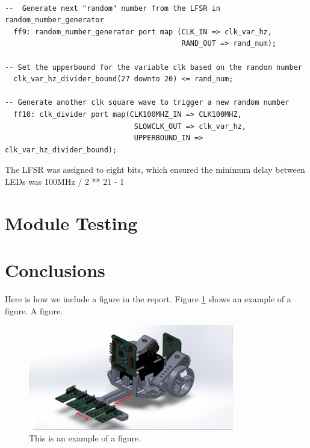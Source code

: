 \documentclass[12pt]{article}
\newenvironment{code}{\captionsetup{type=listing}}{}
\begin{document}
\begin{code}
\begin{verbatim}

--  Generate next "random" number from the LFSR in random_number_generator
  ff9: random_number_generator port map (CLK_IN => clk_var_hz,
                                         RAND_OUT => rand_num);
  
-- Set the upperbound for the variable clk based on the random number  
  clk_var_hz_divider_bound(27 downto 20) <= rand_num;

-- Generate another clk square wave to trigger a new random number
  ff10: clk_divider port map(CLK100MHZ_IN => CLK100MHZ,
                              SLOWCLK_OUT => clk_var_hz,
                              UPPERBOUND_IN => clk_var_hz_divider_bound);
\end{verbatim}
\captionsetup{belowskip=0pt}
\label{code:random_number_generation}
\end{code}

The LFSR was assigned to eight bits, which ensured the minimum delay between LEDs was 100MHz / 2 ** 21 - 1

\newpage

\section{Module Testing}

\newpage

\section{Conclusions}


\newpage


\printbibliography

\appendix

Here is how we include a figure in the report. Figure \ref{fig:example} shows an example of a figure. A figure.

\begin{figure}[H]
  \centering
  \includegraphics[width=0.8\textwidth]{example.png}
  \caption{This is an example of a figure.}
  \label{fig:example}
\end{figure}
\end{document}

